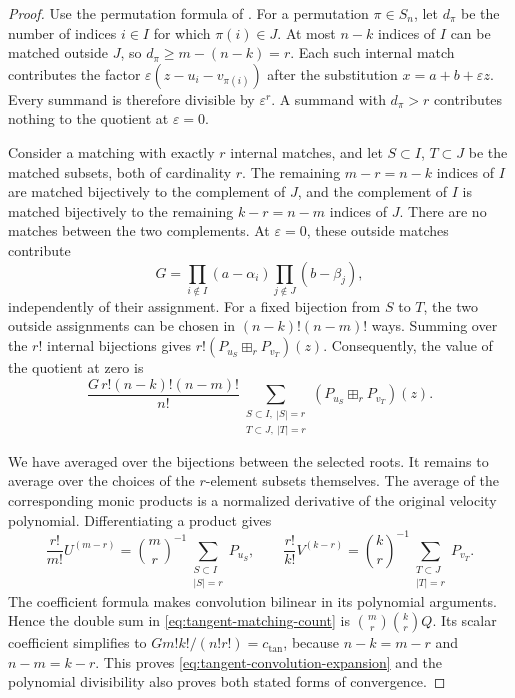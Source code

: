 \documentclass[12pt,reqno]{amsart}
\theoremstyle{definition}
\theoremstyle{remark}
\newcommand{\eps}{\varepsilon}
\begin{document}
\begin{proof}
Use the permutation formula of .  For a
permutation \(\pi\in S_n\), let \(d_\pi\) be the number of indices
\(i\in I\) for which \(\pi(i)\in J\).  At most \(n-k\) indices
of \(I\) can be matched outside \(J\), so
\(d_\pi\geq m-(n-k)=r\).  Each such internal match contributes
the factor \(\eps(z-u_i-v_{\pi(i)})\) after the substitution
\(x=a+b+\eps z\).  Every summand is therefore divisible by
\(\eps^r\).  A summand with \(d_\pi>r\) contributes nothing to
the quotient at \(\eps=0\).

Consider a matching with exactly \(r\) internal matches, and let
\(S\subset I\), \(T\subset J\) be the matched subsets, both of
cardinality \(r\).  The remaining \(m-r=n-k\) indices of \(I\)
are matched bijectively to the complement of \(J\), and the complement
of \(I\) is matched bijectively to the remaining \(k-r=n-m\)
indices of \(J\).  There are no matches between the two complements.
At \(\eps=0\), these outside matches contribute
\[
 G=\prod_{i\notin I}(a-\alpha_i)
       \prod_{j\notin J}(b-\beta_j),
\]
independently of their assignment.  For a fixed bijection from \(S\)
to \(T\), the two outside assignments can be chosen in
\((n-k)!(n-m)!\) ways.  Summing over the \(r!\) internal
bijections gives \(r!(P_{u_S}\boxplus_rP_{v_T})(z)\).  Consequently,
the value of the quotient at zero is
\begin{equation}\label{eq:tangent-matching-count}
 \frac{G\,r!(n-k)!(n-m)!}{n!}
 \sum_{\substack{S\subset I,\ |S|=r\\ T\subset J,\ |T|=r}}
       (P_{u_S}\boxplus_rP_{v_T})(z).
\end{equation}

We have averaged over the bijections between the selected roots. It remains to average over the choices of the \(r\)-element subsets themselves. The average of the corresponding monic products is a normalized derivative of the original velocity polynomial. Differentiating a product gives
\[
 \frac{r!}{m!}U^{(m-r)}
   =\binom mr^{-1}\sum_{\substack{S\subset I\\|S|=r}}P_{u_S},
 \qquad
 \frac{r!}{k!}V^{(k-r)}
   =\binom kr^{-1}\sum_{\substack{T\subset J\\|T|=r}}P_{v_T}.
\]
The coefficient formula makes convolution bilinear in its polynomial arguments. Hence the double sum in \eqref{eq:tangent-matching-count} is \(\binom mr\binom kr Q\). Its scalar coefficient simplifies to
\(Gm!k!/(n!r!)=c_{\mathrm{tan}}\), because \(n-k=m-r\) and \(n-m=k-r\). This proves \eqref{eq:tangent-convolution-expansion} and the polynomial divisibility also proves both stated forms of convergence.


\end{proof}
\end{document}
